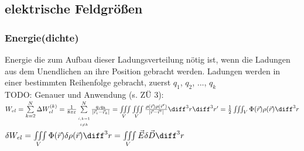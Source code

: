 \subsection{elektrische Feldgrößen}
\subsubsection{Energie(dichte)}
Energie die zum Aufbau dieser Ladungsverteilung nötig ist, wenn die Ladungen aus dem Unendlichen an ihre Position gebracht werden. Ladungen werden in einer bestimmten Reihenfolge gebracht, zuerst $q_1$, $q_2$, ..., $q_k$\\
TODO: Genauer und Anwendung (s. ZÜ 3): \\
$W_{el} = \sum\limits_{k=2}^N \Delta W_{el}^{(k)} = \frac{1}{8\pi\varepsilon} \sum\limits_{\scriptscriptstyle \begin{matrix}\scriptscriptstyle i,k=1 \\[-0.3em] \scriptscriptstyle i \ne k\end{matrix}}^N \frac{q_i q_k}{|\vec r_i - \vec r_k|} = \iiint\limits_V \iiint\limits_V \frac{\rho(\vec r) \rho(\vec r')}{|\vec r - \vec r'|} \diff^3 r \diff^3 r'=\frac{1}{2}\iiint_V \Phi(\vec r)\rho(\vec r)\diff^3 r$\\
$\delta W_{el} = \iiint\limits_V \Phi(\vec r) \delta\rho(\vec r) \diff^3 r = \iiint\limits_V \vec E  \delta \vec D \diff^3 r$\\


